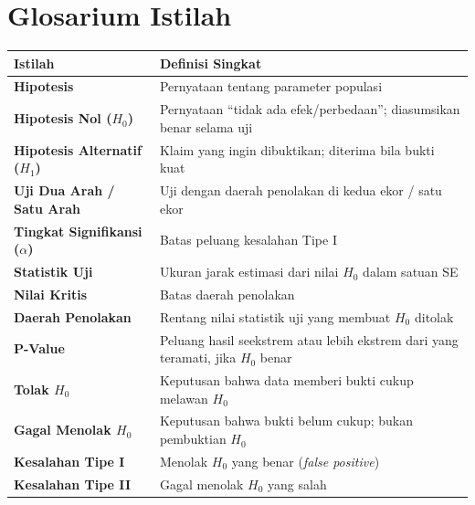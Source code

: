 \documentclass[
  indonesian,
  letterpaper,
]{book}
\newcounter{none} %
\begin{document}

\chapter{Glosarium Istilah}\label{glosarium-istilah-1}

{\def\LTcaptype{none} %
\begin{longtable}[]{@{}
  >{\raggedright\arraybackslash}p{}
  >{\raggedright\arraybackslash}p{}@{}}
\toprule\noalign{}
\begin{minipage}[b]{\linewidth}\raggedright
Istilah
\end{minipage} & \begin{minipage}[b]{\linewidth}\raggedright
Definisi Singkat
\end{minipage} \\
\midrule\noalign{}
\endhead
\bottomrule\noalign{}
\endlastfoot
\textbf{Hipotesis} & Pernyataan tentang parameter populasi \\
\textbf{Hipotesis Nol (\(H_0\))} & Pernyataan ``tidak ada
efek/perbedaan''; diasumsikan benar selama uji \\
\textbf{Hipotesis Alternatif (\(H_1\))} & Klaim yang ingin dibuktikan;
diterima bila bukti kuat \\
\textbf{Uji Dua Arah / Satu Arah} & Uji dengan daerah penolakan di kedua
ekor / satu ekor \\
\textbf{Tingkat Signifikansi (\(\alpha\))} & Batas peluang kesalahan
Tipe I \\
\textbf{Statistik Uji} & Ukuran jarak estimasi dari nilai \(H_0\) dalam
satuan SE \\
\textbf{Nilai Kritis} & Batas daerah penolakan \\
\textbf{Daerah Penolakan} & Rentang nilai statistik uji yang membuat
\(H_0\) ditolak \\
\textbf{P-Value} & Peluang hasil seekstrem atau lebih ekstrem dari yang
teramati, jika \(H_0\) benar \\
\textbf{Tolak \(H_0\)} & Keputusan bahwa data memberi bukti cukup
melawan \(H_0\) \\
\textbf{Gagal Menolak \(H_0\)} & Keputusan bahwa bukti belum cukup;
bukan pembuktian \(H_0\) \\
\textbf{Kesalahan Tipe I} & Menolak \(H_0\) yang benar (\emph{false
positive}) \\
\textbf{Kesalahan Tipe II} & Gagal menolak \(H_0\) yang salah

\end{longtable}}
\end{document}
